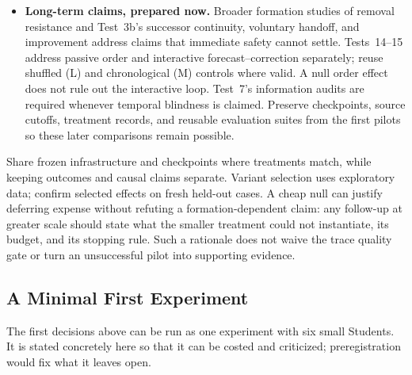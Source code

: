 \documentclass[11pt]{article}
\begin{document}
\begin{itemize}[leftmargin=*]
    useful layers is the question.
    \item \textbf{Long-term claims, prepared now.} Broader formation studies
    of removal resistance and Test~3b's successor continuity, voluntary
    handoff, and improvement address claims that immediate safety cannot
    settle. Tests~14--15 address passive order and interactive
    forecast--correction separately; reuse shuffled (L) and chronological (M)
    controls where valid. A null
    order effect does not rule out the interactive loop. Test~7's information
    audits are required whenever temporal blindness is claimed. Preserve
    checkpoints, source cutoffs, treatment records, and reusable evaluation
    suites from the first pilots so these later comparisons remain possible.
\end{itemize}
Share frozen infrastructure and checkpoints where treatments match, while
keeping outcomes and causal claims separate. Variant selection uses exploratory
data; confirm selected effects on fresh held-out cases. A cheap null can justify
deferring expense without refuting a formation-dependent claim: any follow-up
at greater scale should state what the smaller treatment could not instantiate,
its budget, and its stopping rule. Such a rationale does not waive the trace
quality gate or turn an unsuccessful pilot into supporting evidence.

\subsection{A Minimal First Experiment}\label{sec:first-experiment}

The first decisions above can be run as one experiment with six small
Students. It is stated concretely here so that it can be costed and
criticized; preregistration would fix what it leaves open.
\end{document}
